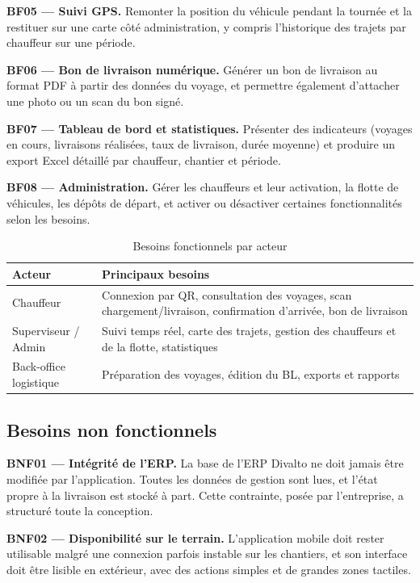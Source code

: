 \documentclass[12pt,a4paper]{report}
\begin{document}
\textbf{BF05 — Suivi GPS.} Remonter la position du véhicule pendant la tournée et la restituer sur une carte côté administration, y compris l'historique des trajets par chauffeur sur une période.

\textbf{BF06 — Bon de livraison numérique.} Générer un bon de livraison au format PDF à partir des données du voyage, et permettre également d'attacher une photo ou un scan du bon signé.

\textbf{BF07 — Tableau de bord et statistiques.} Présenter des indicateurs (voyages en cours, livraisons réalisées, taux de livraison, durée moyenne) et produire un export Excel détaillé par chauffeur, chantier et période.

\textbf{BF08 — Administration.} Gérer les chauffeurs et leur activation, la flotte de véhicules, les dépôts de départ, et activer ou désactiver certaines fonctionnalités selon les besoins.

\begin{table}[htbp]
\centering
\caption{Besoins fonctionnels par acteur}
\label{tab:besoins_acteurs}
\begin{tabular}{|l|p{9cm}|}
\hline
\textbf{Acteur} & \textbf{Principaux besoins} \\
\hline
Chauffeur & Connexion par QR, consultation des voyages, scan chargement/livraison, confirmation d'arrivée, bon de livraison \\
\hline
Superviseur / Admin & Suivi temps réel, carte des trajets, gestion des chauffeurs et de la flotte, statistiques \\
\hline
Back-office logistique & Préparation des voyages, édition du BL, exports et rapports \\
\hline
\end{tabular}
\end{table}

\subsection{Besoins non fonctionnels}

\textbf{BNF01 — Intégrité de l'ERP.} La base de l'ERP Divalto ne doit jamais être modifiée par l'application. Toutes les données de gestion sont lues, et l'état propre à la livraison est stocké à part. Cette contrainte, posée par l'entreprise, a structuré toute la conception.

\textbf{BNF02 — Disponibilité sur le terrain.} L'application mobile doit rester utilisable malgré une connexion parfois instable sur les chantiers, et son interface doit être lisible en extérieur, avec des actions simples et de grandes zones tactiles.
\end{document}
